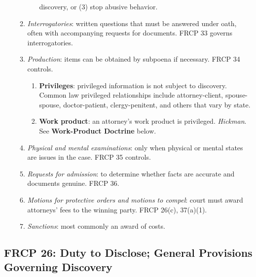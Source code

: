 \begin{enumerate}
\begin{enumerate}
\begin{enumerate}
            discovery, or (3) stop abusive behavior.
        \end{enumerate}
        \item \emph{Interrogatories}: written questions that must be answered 
        under oath, often with accompanying requests for documents. FRCP 33 
        governs interrogatories.
        \item \emph{Production}: items can be obtained by subpoena if 
        necessary. FRCP 34 controls.
        \begin{enumerate}
            \item \textbf{Privileges}: privileged information is not subject 
            to discovery. Common law privileged relationships include 
            attorney-client, spouse-spouse, doctor-patient, clergy-penitent, 
            and others that vary by state.
            \item \textbf{Work product}: an attorney's work product is 
            privileged. \emph{Hickman}. See \textbf{Work-Product Doctrine} 
            below.
        \end{enumerate}
        \item \emph{Physical and mental examinations}: only when physical or 
        mental states are issues in the case. FRCP 35 controls.
        \item \emph{Requests for admission}: to determine whether facts are 
        accurate and documents genuine. FRCP 36.
        \item \emph{Motions for protective orders and motions to compel}: 
        court must award attorneys' fees to the winning party. FRCP 26(c), 
        37(a)(1).
        \item \emph{Sanctions}: most commonly an award of costs.
    \end{enumerate}
\end{enumerate}

\subsection{FRCP 26: Duty to Disclose; General Provisions Governing Discovery}

